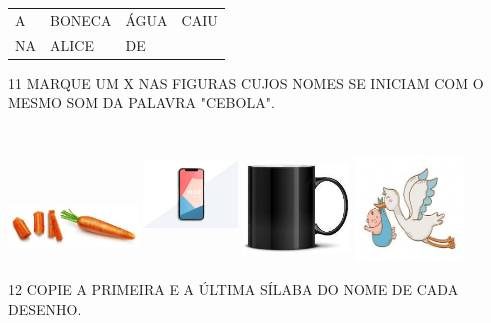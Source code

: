 
\begin{longtable}[]{@{}llll@{}}
\toprule
A & BONECA & ÁGUA & CAIU\tabularnewline
NA & ALICE & DE\tabularnewline
\bottomrule
\end{longtable}


\num{11} MARQUE UM X NAS FIGURAS CUJOS NOMES SE INICIAM COM O MESMO SOM DA PALAVRA "CEBOLA".


\includegraphics[width=1.36272in,height=0.72875in]{media/image105.jpg}
\includegraphics[width=0.98256in,height=1.40209in]{media/image107.jpg}
\includegraphics[width=1.12500in,height=1.12500in]{media/image108.jpg}
\includegraphics[width=1.13713in,height=1.09392in]{media/image109.jpg}


\num{12} COPIE A PRIMEIRA E A ÚLTIMA SÍLABA DO NOME DE CADA DESENHO.\bigskip

